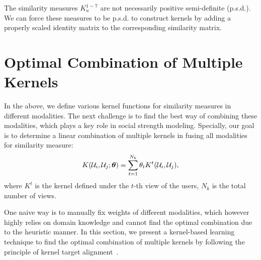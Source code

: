 The similarity measures $K_u^{1\sim7}$ are not necessarily positive semi-definite (p.s.d.). We can force these measures to be p.s.d. to construct kernels by adding a properly scaled identity matrix to the corresponding similarity matrix.

\section{Optimal Combination of Multiple Kernels} \label{sec:kta}

In the above, we define various kernel functions for similarity measures in different modalities. The next challenge is to find the best way of combining these
modalities, which plays a key role in social strength modeling. Specially, our goal is to determine a linear combination of multiple kernels in fusing all
modalities for similarity measure:
\begin{equation}
K(\u_i, \u_j;\bm\theta) = \sum_{t = 1}^{N_k} \theta_tK^t(\u_i, \u_j), \label{eqn:multi-kernel}
\end{equation}
where $K^t$ is the kernel defined under the $t$-th view of the users, $N_k$ is the total number of views.

One naive way is to manually fix weights of different modalities, which however highly relies on domain knowledge and cannot find the optimal combination due to
the heuristic manner.
In this section, we present a kernel-based learning technique to find the optimal combination of multiple kernels by following the principle of kernel target
alignment~\cite{nips/CristianiniSEK01}.

